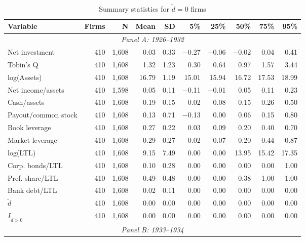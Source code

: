 \begin{table}[p]\centering
    \caption{\\ Summary statistics for $\tilde{d} = 0$ firms}\scriptsize
    \label{tabapp:summary_I_1}
    \begin{threeparttable}
        \begin{tabular}{lrrrrrrrrr}
            \toprule
            Variable & Firms & N & Mean & SD & 5\% & 25\% & 50\% & 75\% & 95\% \\
            \midrule
            \multicolumn{10}{c}{\textit{Panel A: 1926--1932}} \\
            \midrule
            Net investment & 410 & 1,608 & 0.03 & 0.33 & $-$0.27 & $-$0.06 & $-$0.02 & 0.04 & 0.41 \\
            Tobin's Q & 410 & 1,608 & 1.32 & 1.23 & 0.30 & 0.64 & 0.97 & 1.57 & 3.44 \\
            log(Assets) & 410 & 1,608 & 16.79 & 1.19 & 15.01 & 15.94 & 16.72 & 17.53 & 18.99 \\
            Net income/assets & 410 & 1,598 & 0.05 & 0.11 & $-$0.11 & $-$0.01 & 0.05 & 0.11 & 0.23 \\
            Cash/assets & 410 & 1,608 & 0.19 & 0.15 & 0.02 & 0.08 & 0.15 & 0.26 & 0.50 \\
            Payout/common stock & 410 & 1,608 & 0.13 & 0.71 & $-$0.13 & 0.00 & 0.06 & 0.15 & 0.80 \\
            Book leverage & 410 & 1,608 & 0.27 & 0.22 & 0.03 & 0.09 & 0.20 & 0.40 & 0.70 \\
            Market leverage & 410 & 1,608 & 0.29 & 0.27 & 0.02 & 0.07 & 0.20 & 0.44 & 0.87 \\
            log(LTL) & 410 & 1,608 & 9.15 & 7.49 & 0.00 & 0.00 & 13.95 & 15.42 & 17.35 \\
            Corp. bonds/LTL & 410 & 1,608 & 0.10 & 0.28 & 0.00 & 0.00 & 0.00 & 0.00 & 1.00 \\
            Pref. share/LTL & 410 & 1,608 & 0.49 & 0.48 & 0.00 & 0.00 & 0.38 & 1.00 & 1.00 \\
            Bank debt/LTL & 410 & 1,608 & 0.02 & 0.11 & 0.00 & 0.00 & 0.00 & 0.00 & 0.00 \\
            \ensuremath{\tilde{d}} & 410 & 1,608 & 0.00 & 0.00 & 0.00 & 0.00 & 0.00 & 0.00 & 0.00 \\
            \ensuremath{I_{\tilde{d}>0}} & 410 & 1,608 & 0.00 & 0.00 & 0.00 & 0.00 & 0.00 & 0.00 & 0.00 \\
            \midrule
            \multicolumn{10}{c}{\textit{Panel B: 1933--1934}} \\

\end{tabular}
\end{threeparttable}
\end{table}
